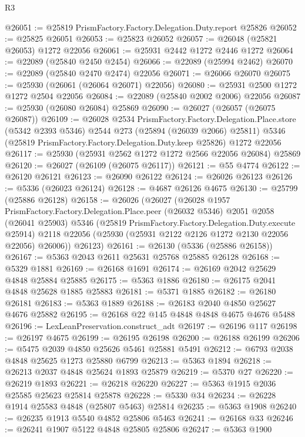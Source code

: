 \begin{lexlean}{R3}
\begin{coremodule}
@26051 := @25819 PrismFactory.Factory.Delegation.Duty.report @25826
@26052 := @25825 @26051
@26053 := @25823 @26052
@26057 := @26048 (@25821 @26053) @1272 @22056
@26061 := @25931 @2442 @1272 @2446 @1272
@26064 := @22089 (@25840 @2450 @2454)
@26066 := @22089 (@25994 @2462)
@26070 := @22089 (@25840 @2470 @2474) @22056
@26071 := @26066 @26070
@26075 := @25930 (@26061 (@26064 @26071) @22056)
@26080 := @25931 @2500 @1272 @1272 @2504 @22056
@26084 := @22089 (@25840 @2002 @2006) @22056
@26087 := @25930 (@26080 @26084) @25869
@26090 := @26027 (@26057 (@26075 @26087))
@26109 := @26028
    @2534
    PrismFactory.Factory.Delegation.Place.store
    (@5342 @2393 @5346)
    @2544
    @273
    (@25894 (@26039 @2066) @25811)
    @5346
    (@25819 PrismFactory.Factory.Delegation.Duty.keep @25826)
    @1272
    @22056
@26117 := @25930 (@25931 @2562 @1272 @1272 @2566 @22056 @26084) @25869
@26120 := @26027 (@26109 (@26075 @26117))
@26121 := @55 @4774
@26122 := @26120 @26121
@26123 := @26090 @26122
@26124 := @26026 @26123
@26126 := @5336 (@26023 @26124)
@26128 := @4687 @26126 @4675
@26130 := @25799 (@25886 @26128)
@26158 := @26026
    (@26027
      (@26028
        @1957
        PrismFactory.Factory.Delegation.Place.peer
        (@26032 @5346)
        @2051
        @2058
        (@26041 @25903)
        @5346
        (@25819 PrismFactory.Factory.Delegation.Duty.execute @25914)
        @2118
        @22056
        (@25930 (@25931 @2122 @2126 @1272 @2130 @22056 @22056) @26006))
      @26123)
@26161 := @26130 (@5336 (@25886 @26158))
@26167 := @5363 @2043 @2611 @25631 @25768 @25885 @26128
@26168 := @5329 @1881
@26169 := @26168 @1691
@26174 := @26169 @2042 @25629 @4848 @25884 @25885
@26175 := @5363 @1886
@26180 := @26175 @2041 @4848 @25628 @1885 @25883
@26181 := @5371 @1885
@26182 := @26180 @26181
@26183 := @5363 @1889
@26188 := @26183 @2040 @4850 @25627 @4676 @25882
@26195 := @26168 @22 @145 @4848 @4848 @4675 @4676 @5488
@26196 := LexLeanPreservation.construct_adt
@26197 := @26196 @117
@26198 := @26197 @4675
@26199 := @26195 @26198
@26200 := @26188 @26199
@26206 := @5475 @2039 @4850 @25626 @5461 @25881 @5491
@26212 := @6793 @2038 @4848 @25625 @1273 @25880 @6799
@26213 := @5363 @1894
@26218 := @26213 @2037 @4848 @25624 @1893 @25879
@26219 := @5370 @27
@26220 := @26219 @1893
@26221 := @26218 @26220
@26227 := @5363 @1915 @2036 @25585 @25623 @25814 @25878
@26228 := @5330 @34
@26234 := @26228 @1914 @25583 @4848 (@25807 @5463) @25814
@26235 := @5363 @1908
@26240 := @26235 @1913 @5540 @4852 @25806 @5463
@26241 := @26168 @33
@26246 := @26241 @1907 @5122 @4848 @25805 @25806
@26247 := @5363 @1900

\end{coremodule}
\end{lexlean}
